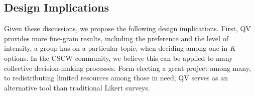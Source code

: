 \subsection{Design Implications}
Given these discussions,
we propose the following design implications.
First, QV provides more fine-grain results,
including the preference and the level of intensity,
a group has on a particular topic,
when deciding among one in $K$ options.
In the CSCW community,
we believe this can be applied to 
many collective decision-making processes.
Form electing a great project among many,
to redistributing limited resources among those in need,
QV serves as an alternative tool 
than traditional Likert surveys.
